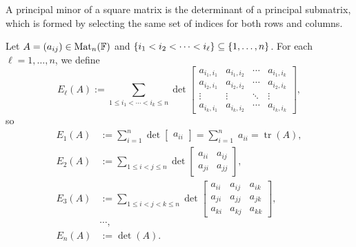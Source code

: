 \documentclass[11pt,openany]{article}
\newcommand{\Mat}{\operatorname{Mat}}
\newcommand{\tr}{\operatorname{tr}}
\begin{document}
\newpage
\begin{note}
A principal minor of a square matrix is the determinant of a principal submatrix, which is formed by selecting the same set of indices for both rows and columns.

Let $A=(a_{ij})\in\Mat_{n}(\F)$ and $\set{i_1<i_2<\cdots<i_\ell}\subseteq\set{1,\dots,n}$. For each $\ell=1,\dots,n$, we define \[
E_\ell(A):=\sum_{1\leq i_1<\cdots<i_k\leq n}\det\begin{bmatrix}
	a_{i_1,i_1} & a_{i_1,i_2} & \cdots & a_{i_1,i_k} \\
	a_{i_2,i_1} & a_{i_2,i_2} & \cdots & a_{i_2,i_k} \\
	\vdots & \vdots & \ddots & \vdots \\
	a_{i_k,i_1} & a_{i_k,i_2} & \cdots & a_{i_k,i_k}
\end{bmatrix},
\] so
\begin{align*}
	E_1(A)&:=\sum_{i=1}^n\det\begin{bmatrix}
		a_{ii}
	\end{bmatrix}=\sum_{i=1}^n\; a_{ii}=\tr(A),\\
	E_2(A)&:=\sum_{1\leq i<j\leq n}\det\begin{bmatrix}
		a_{ii} & a_{ij} \\ a_{ji} & a_{jj}
	\end{bmatrix}, \\
E_3(A)&:=\sum_{1\leq i<j<k\leq n}\det\begin{bmatrix}
a_{ii} & a_{ij} & a_{ik} \\ 
a_{ji} & a_{jj} & a_{jk} \\
a_{ki} & a_{kj} & a_{kk}
\end{bmatrix},\\
	&\cdots, \\
	E_n(A)&:=\det(A).
\end{align*}
\end{note}
\end{document}
